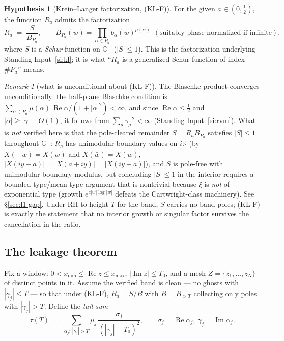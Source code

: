 \documentclass[11pt]{article}
\theoremstyle{definition}
\newtheorem{hypothesis}[theorem]{Hypothesis}
\theoremstyle{remark}
\newtheorem{remark}[theorem]{Remark}
\newcommand{\CP}{\mathbb{C}_{+}}
\newcommand{\R}{\mathbb{R}}
\newcommand{\re}{\operatorname{Re}}
\newcommand{\im}{\operatorname{Im}}
\begin{document}
\begin{hypothesis}[Krein--Langer factorization, {(KL-F)}]\label{hyp:klf}
For the given $a\in(0,\tfrac12)$, the function $R_a$ admits the factorization
\[
R_a\;=\;\frac{S}{B_{P_a}},\qquad
B_{P_a}(w)=\prod_{\alpha\in P_a}b_{\alpha}(w)^{\mu(\alpha)}
\ \ (\text{suitably phase-normalized if infinite}),
\]
where $S$ is a \emph{Schur} function on $\CP$ ($|S|\le1$). This is the
factorization underlying Standing Input~\ref{si:kl}; it is what ``$R_a$ is a
generalized Schur function of index $\#P_a$'' means.
\end{hypothesis}

\begin{remark}[what is unconditional about (KL-F)]\label{rem:blaschke-conv}
The Blaschke product converges unconditionally: the half-plane Blaschke
condition is $\sum_{\alpha\in P_a}\mu(\alpha)\,\re\alpha/(1+|\alpha|^2)<\infty$,
and since $\re\alpha\le\tfrac12$ and $|\alpha|\ge|\gamma|-O(1)$, it follows
from $\sum_\rho\gamma_\rho^{-2}<\infty$ (Standing Input~\ref{si:rvm}).
What is \emph{not} verified here is that the pole-cleared remainder
$S=R_aB_{P_a}$ satisfies $|S|\le1$ throughout $\CP$: $R_a$ has unimodular
boundary values on $i\R$ (by $X(-w)=X(w)$ and $X(\bar w)=\overline{X(w)}$,
$|X(iy-a)|=|X(a+iy)|=|X(iy+a)|$), and $S$ is pole-free with unimodular
boundary modulus, but concluding $|S|\le1$ in the interior requires a
bounded-type/mean-type argument that is nontrivial because $\xi$ is
\emph{not} of exponential type (growth $e^{c|w|\log|w|}$ defeats the
Cartwright-class machinery). See \S\ref{sec:l1-gap}. Under RH-to-height-$T$
for the band, $S$ carries no band poles; (KL-F) is exactly the statement that
no interior growth or singular factor survives the cancellation in the ratio.
\end{remark}

\subsection{The leakage theorem}

Fix a window: $0<x_{\min}\le\re z\le x_{\max}$, $|\im z|\le T_0$, and a mesh
$Z=\{z_1,\dots,z_N\}$ of distinct points in it. Assume the verified band is
clean --- no ghosts with $|\gamma_j|\le T$ --- so that under (KL-F),
$R_a=S/B$ with $B=B_{>T}$ collecting only poles with $|\gamma_j|>T$. Define
the \emph{tail sum}
\[
\tau(T)\;=\;\sum_{\alpha_j:\,|\gamma_j|>T}\mu_j\,
\frac{\sigma_j}{(|\gamma_j|-T_0)^{2}},
\qquad \sigma_j=\re\alpha_j,\ \gamma_j=\im\alpha_j .
\]
\end{document}
